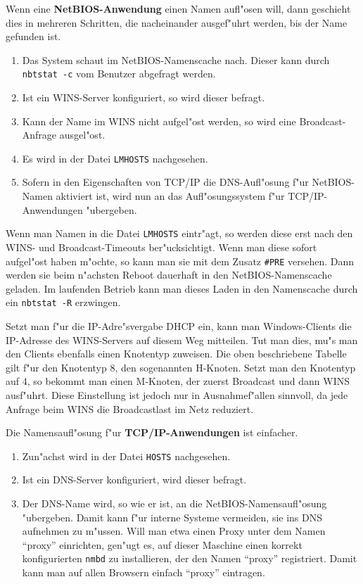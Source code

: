 \documentclass{scrartcl}\usepackage{pslatex}\typearea{12}
\newcommand{\prog}{\texttt}
\newcommand{\dateistyle}{\texttt}
\newcommand{\nbname}{\texttt}
\begin{document}
Wenn eine {\bfseries NetBIOS-Anwendung} einen Namen aufl"osen will,
dann geschieht dies in mehreren Schritten, die nacheinander
ausgef"uhrt werden, bis der Name gefunden ist.

\begin{enumerate}
\item Das System schaut im NetBIOS-Namenscache nach. Dieser kann durch
  \prog{nbtstat -c} vom Benutzer abgefragt werden.
\item Ist ein WINS-Server konfiguriert, so wird dieser befragt.
\item Kann der Name im WINS nicht aufgel"ost werden, so wird eine
  Broadcast-Anfrage ausgel"ost.
\item Es wird in der Datei \dateistyle{LMHOSTS} nachgesehen.
\item Sofern in den Eigenschaften von TCP/IP die DNS-Aufl"osung f"ur
  NetBIOS-Namen aktiviert ist, wird nun an das Aufl"osungssystem f"ur
  TCP/IP-Anwendungen "ubergeben.
\end{enumerate}

Wenn man Namen in die Datei \dateistyle{LMHOSTS} eintr"agt, so werden diese
erst nach den WINS- und Broadcast-Timeouts ber"ucksichtigt. Wenn man
diese sofort aufgel"ost haben m"ochte, so kann man sie mit dem Zusatz
\nbname{\#PRE} versehen. Dann werden sie beim n"achsten Reboot
dauerhaft in den NetBIOS-Namenscache geladen. Im laufenden Betrieb
kann man dieses Laden in den Namenscache durch ein \prog{nbtstat -R}
erzwingen.

Setzt man f"ur die IP-Adre"svergabe DHCP ein, kann man Windows-Clients
die IP-Adresse des WINS-Servers auf diesem Weg mitteilen. Tut man
dies, mu"s man den Clients ebenfalls einen Knotentyp zuweisen. Die
oben beschriebene Tabelle gilt f"ur den Knotentyp 8, den sogenannten
H-Knoten. Setzt man den Knotentyp auf 4, so bekommt man einen
M-Knoten, der zuerst Broadcast und dann WINS ausf"uhrt. Diese
Einstellung ist jedoch nur in Ausnahmef"allen sinnvoll, da jede
Anfrage beim WINS die Broadcastlast im Netz reduziert.

Die Namensaufl"osung f"ur {\bfseries TCP/IP-Anwendungen} ist
einfacher.

\begin{enumerate}
\item Zun"achst wird in der Datei \dateistyle{HOSTS} nachgesehen.
\item Ist ein DNS-Server konfiguriert, wird dieser befragt.
\item Der DNS-Name wird, so wie er ist, an die
  NetBIOS-Namensaufl"osung "ubergeben. Damit kann f"ur interne Systeme
  vermeiden, sie ins DNS aufnehmen zu m"ussen. Will man etwa einen
  Proxy unter dem Namen "`proxy"' einrichten, gen"ugt es, auf dieser
  Maschine einen korrekt konfigurierten \prog{nmbd} zu installieren,
  der den Namen "`proxy"' registriert. Damit kann man auf allen
  Browsern einfach "`proxy"' eintragen.
\end{enumerate}
\end{document}
